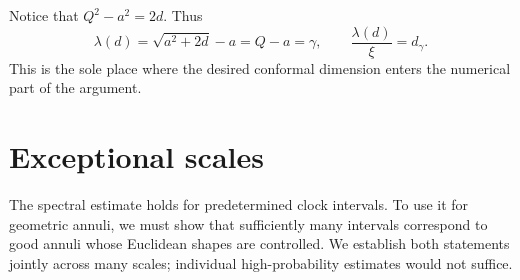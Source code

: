 \documentclass[11pt,reqno]{amsart}
\theoremstyle{plain}
\theoremstyle{definition}
\theoremstyle{remark}
\newcommand{\1}{\mathbf{1}}
\begin{document}
Notice that $Q^2-a^2=2d$. Thus
\begin{equation}\label{eq:critical}
\lambda(d)=\sqrt{a^2+2d}-a=Q-a=\gamma,
\qquad
\frac{\lambda(d)}{\xi}=d_\gamma.
\end{equation}
This is the sole place where the desired conformal dimension enters the numerical part of the argument.

\section{Exceptional scales}\label{sec:exceptions}
The spectral estimate holds for predetermined clock intervals. To use it for geometric annuli, we must show that sufficiently many intervals correspond to good annuli whose Euclidean shapes are controlled. We establish both statements jointly across many scales; individual high-probability estimates would not suffice.
\end{document}
